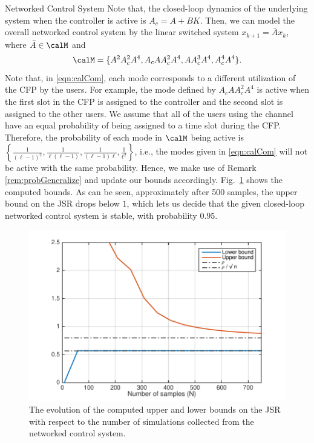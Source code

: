 \begin{subsection}{Networked Control System}
Note that, the closed-loop dynamics of the underlying system when the controller is active is $A_c = A+BK$. Then, we can model the overall networked control system by the linear switched system $x_{k+1} = \bar{A}x_k$, where $\bar{A} \in \calM$ and
\begin{equation}\label{eqn:calCom}\calM = \{A^2A_c^2A^4, A_cAA_c^2A^4,AA_c^3A^4, A_c^4A^4\}.
\end{equation}
Note that, in \eqref{eqn:calCom}, each mode corresponds to a different utilization of the CFP by the users. For example, the mode defined by $A_cAA_c^2A^4$ is active when the first slot in the CFP is assigned to the controller and the second slot is assigned to the other users. We assume that all of the users using the channel have an equal probability of being assigned to a time slot during the CFP. Therefore, the probability of each mode in $\calM$ being active is $\left\{\frac{1}{(\ell-1)^2}, \frac{1}{\ell(\ell-1)}, \frac{1}{(\ell-1)\ell}, \frac{1}{\ell^2}\right\}$, i.e., the modes given in \eqref{eqn:calCom} will not be active with the same probability. Hence, we make use of Remark \ref{rem:probGeneralize} and update our bounds accordingly. Fig.~\ref{fig:4} shows the computed bounds. As can be seen, approximately after 500 samples,  the upper bound on the JSR drops below $1$, which lets us decide that the given closed-loop networked control system is stable, with probability $0.95$.

\begin{figure}
    \centering
        \includegraphics[scale=0.7]{networkControl.pdf}
    \caption{The evolution of the computed upper and lower bounds on the JSR with respect to the number of simulations collected from the networked control system.}
        \label{fig:4}
\end{figure}

\end{subsection}